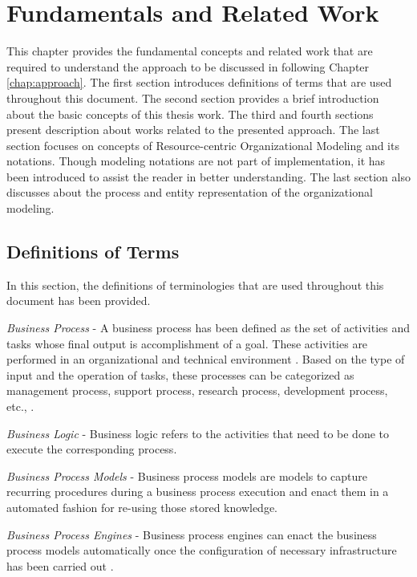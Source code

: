 \chapter{Fundamentals and Related Work}
\label{chap:fundamentals}
This chapter provides the fundamental concepts and related work that are required to understand the approach to be discussed in following Chapter \ref{chap:approach}. The first section introduces definitions of terms that are used throughout this document. The second section provides a brief introduction about the basic concepts of this thesis work.  The third and fourth sections present description about  works related to the presented approach. The last section focuses on concepts of Resource-centric Organizational Modeling and its notations. Though modeling notations are not part of implementation, it has been introduced to assist the reader in better understanding. The last section also discusses about the process and entity representation of the organizational modeling.  

\section{Definitions of Terms}
\label{sec:termdefinitions}
In this section, the definitions of terminologies that are used throughout this document has been provided.

\textit{Business Process} -  A business process has been defined as the set of activities and tasks whose final output is accomplishment of a goal. These activities are performed in an organizational and technical environment \cite{Weske2012}.  Based on the type of input and the operation of tasks, these processes can be categorized as management process, support process, research process, development process, etc., \cite{Sungur2015}.   

\textit{Business Logic} - Business logic refers to the activities that need to be done to execute the corresponding process. 

\textit{Business Process Models} - Business process models are models to capture recurring procedures during a business process execution and enact them in a automated fashion for re-using those stored knowledge. 

\textit{Business Process Engines} - Business process engines can enact the business process models automatically once the configuration of necessary infrastructure has been carried out \cite{Sungur2015}.	

